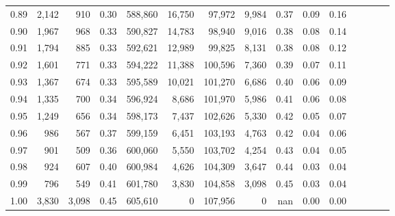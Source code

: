 \begin{tabular}{rrrcrrrrrrrrrrr}
0.89 &   2,142 &    910 &                                       0.30 &  588,860 &   16,750 &   97,972 &    9,984 &  0.37 &  0.09 &                         0.16 \\
0.90 &   1,967 &    968 &                                       0.33 &  590,827 &   14,783 &   98,940 &    9,016 &  0.38 &  0.08 &                         0.14 \\
0.91 &   1,794 &    885 &                                       0.33 &  592,621 &   12,989 &   99,825 &    8,131 &  0.38 &  0.08 &                         0.12 \\
0.92 &   1,601 &    771 &                                       0.33 &  594,222 &   11,388 &  100,596 &    7,360 &  0.39 &  0.07 &                         0.11 \\
0.93 &   1,367 &    674 &                                       0.33 &  595,589 &   10,021 &  101,270 &    6,686 &  0.40 &  0.06 &                         0.09 \\
0.94 &   1,335 &    700 &                                       0.34 &  596,924 &    8,686 &  101,970 &    5,986 &  0.41 &  0.06 &                         0.08 \\
0.95 &   1,249 &    656 &                                       0.34 &  598,173 &    7,437 &  102,626 &    5,330 &  0.42 &  0.05 &                         0.07 \\
0.96 &     986 &    567 &                                       0.37 &  599,159 &    6,451 &  103,193 &    4,763 &  0.42 &  0.04 &                         0.06 \\
0.97 &     901 &    509 &                                       0.36 &  600,060 &    5,550 &  103,702 &    4,254 &  0.43 &  0.04 &                         0.05 \\
0.98 &     924 &    607 &                                       0.40 &  600,984 &    4,626 &  104,309 &    3,647 &  0.44 &  0.03 &                         0.04 \\
0.99 &     796 &    549 &                                       0.41 &  601,780 &    3,830 &  104,858 &    3,098 &  0.45 &  0.03 &                         0.04 \\
1.00 &   3,830 &  3,098 &                                       0.45 &  605,610 &        0 &  107,956 &        0 &   nan &  0.00 &                         0.00 \\
\bottomrule
\end{tabular}
